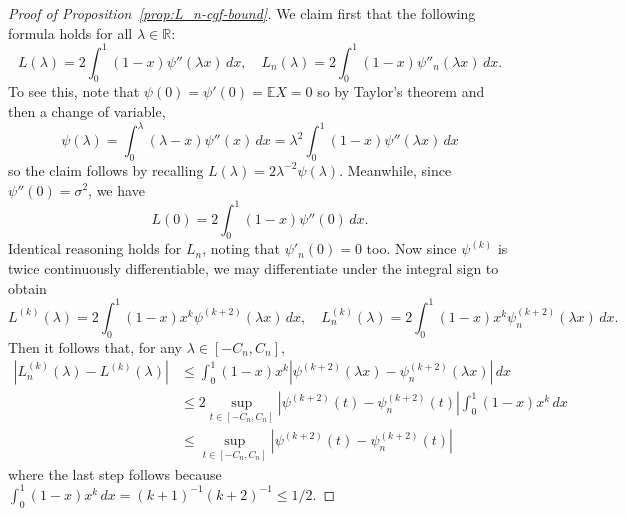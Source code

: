 \documentclass{article}
\theoremstyle{definition}
\newcommand{\R}{\mathbb{R}}
\newcommand{\E}{\mathbb{E}}
\newcommand{\1}{\mathbbm{1}}
\begin{document}
\begin{proof}[Proof of Proposition~\ref{prop:L_n-cgf-bound}]
    
We claim first that the following formula holds for all $\lambda \in \R$:
    \begin{equation}
        L(\lambda) = 2\int_0^1 (1 - x)\psi''(\lambda x) \, dx, \quad L_n(\lambda) = 2\int_0^1 (1 - x)\psi''_n(\lambda x) \, dx.  \label{eqn:L-integral-rep}
    \end{equation}
    To see this, note that $\psi(0) = \psi'(0) = \E X= 0$ so by Taylor's theorem and then a change of variable,
    \[
    \psi(\lambda) = \int_0^\lambda (\lambda - x)\psi''(x) \, dx = \lambda^2\int_0^1 (1 - x) \psi''(\lambda x) \, dx 
    \]
    so the claim follows by recalling $L(\lambda) = 2\lambda^{-2}\psi(\lambda)$. Meanwhile, since $\psi''(0) = \sigma^2$, we have 
    \[
    L(0) = 2\int_0^1 (1 - x) \psi''(0) \, dx.
    \]
    Identical reasoning holds for $L_n$, noting that $\psi'_n(0) = 0$ too. Now since $\psi^{(k)}$ is twice continuously differentiable, we may differentiate under the integral sign to obtain
    \[
    L^{(k)}(\lambda) = 2\int_0^1 (1 - x)x^k \psi^{(k+2)}(\lambda x) \, dx , \quad L_n^{(k)}(\lambda) = 2 \int_0^1(1 - x)x^k \psi^{(k+2)}_n(\lambda x)\, dx.
    \]
    Then it follows that, for any $\lambda \in [-C_n, C_n]$, 
    \begin{align*}
         |L_n^{(k)}(\lambda) - L^{(k)}(\lambda)|&\leq \int_0^1 (1 - x)x^k|\psi^{(k+2)}(\lambda x) - \psi_n^{(k+2)}(\lambda x)| \, dx \\ &\leq 2\sup_{t \in [-C_n, C_n]} |\psi^{(k+2)}(t) - \psi^{(k+2)}_n(t)| \int_0^1 (1 - x)x^k \, dx \\
        &\leq \sup_{t \in [-C_n, C_n]} |\psi^{(k+2)}(t) - \psi^{(k+2)}_n(t)|
    \end{align*}
    where the last step follows because $\int_0^1 (1-x)x^k \, dx = (k+1)^{-1}(k+2)^{-1} \leq 1/2$.
\end{proof}
\end{document}

